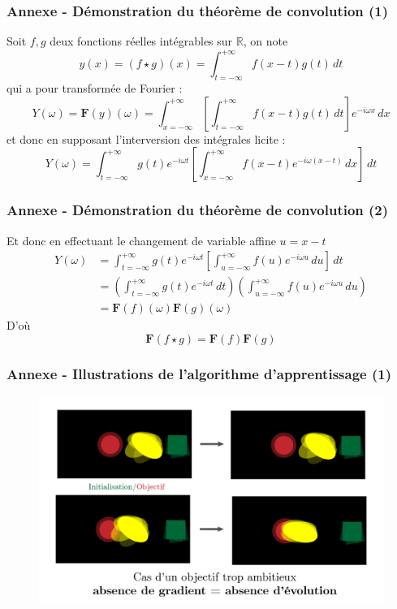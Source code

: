 \documentclass[aspectratio=43]{beamer}
\begin{document}
\begin{frame}
	\frametitle{Annexe - Démonstration du théorème de convolution (1)}

	Soit $f, g$ deux fonctions réelles intégrables sur $\mathbb{R}$, on note
	\[
		y(x) = (f \star g)(x) = \int_{t = -\infty}^{+\infty} f(x-t)g(t)\,dt
	\]
	qui a pour transformée de Fourier :
	\[
		Y(\omega) = \mathbf{F}(y)(\omega) = \int_{x = -\infty}^{+\infty} \left[ \int_{t = -\infty}^{+\infty} f(x-t)g(t)\,dt \right] e^{-i\omega x}\,dx
	\]
	et donc en supposant l'interversion des intégrales licite :
	\[
		Y(\omega) = \int_{t = -\infty}^{+\infty} g(t)e^{-i\omega t} \left[ \int_{x = -\infty}^{+\infty} f(x-t) e^{-i\omega (x - t)}\,dx \right] \,dt
	\]
\end{frame}

\begin{frame}
	\frametitle{Annexe - Démonstration du théorème de convolution (2)}

	Et donc en effectuant le changement de variable affine $u = x - t$
	\begin{align*}
		Y(\omega) &= \int_{t = -\infty}^{+\infty} g(t)e^{-i\omega t} \left[ \int_{u = -\infty}^{+\infty} f(u) e^{-i\omega u}\,du \right] \,dt \\
		&= \left( \int_{t = -\infty}^{+\infty} g(t)e^{-i\omega t}\,dt \right) \left( \int_{u = -\infty}^{+\infty} f(u) e^{-i\omega u}\,du \right) \\
		&= \mathbf{F}(f)(\omega) \mathbf{F}(g)(\omega)
	\end{align*}
	D'où
	\[
		\mathbf{F}(f \star g) = \mathbf{F}(f)\mathbf{F}(g) 
	\]
\end{frame}

\begin{frame}
	\frametitle{Annexe - Illustrations de l'algorithme d'apprentissage (1)}
	
	\centering
	\begin{figure}[H]
		\includegraphics[width=.9\textwidth]{illustration_bad_target.png}
	\end{figure}
\end{frame}
\end{document}
